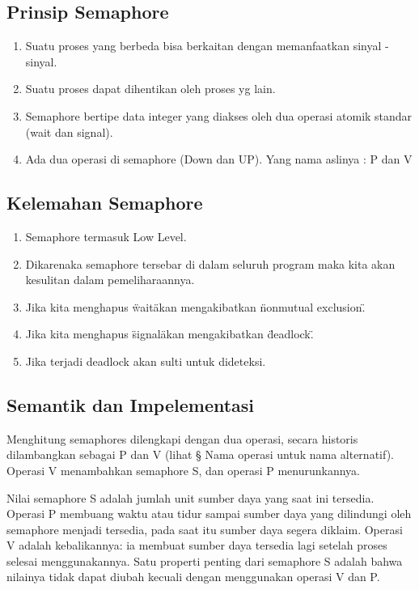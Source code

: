 	\subsection{Prinsip Semaphore}
	
		\begin{enumerate}

			\item Suatu proses yang berbeda bisa berkaitan dengan memanfaatkan sinyal - sinyal.
			\item Suatu proses dapat dihentikan oleh proses yg lain.
			\item Semaphore bertipe data integer yang diakses oleh dua operasi atomik standar (wait dan signal).
			\item Ada dua operasi di semaphore (Down dan UP). Yang nama aslinya : P dan V
		
		\end{enumerate}

	\subsection{Kelemahan Semaphore}
	
		\begin{enumerate}

			\item Semaphore termasuk Low Level.
			\item Dikarenaka semaphore tersebar di dalam seluruh program maka kita akan kesulitan dalam pemeliharaannya.
			\item Jika kita menghapus \"wait\" akan mengakibatkan \"nonmutual exclusion\".
			\item Jika kita menghapus \"signal\" akan mengakibatkan \"deadlock\".
			\item Jika terjadi deadlock akan sulti untuk dideteksi.

		\end{enumerate}
		
	\subsection{Semantik dan Impelementasi}
		Menghitung semaphores dilengkapi dengan dua operasi, secara historis dilambangkan sebagai P dan V (lihat § Nama operasi untuk nama alternatif). Operasi V menambahkan semaphore S, dan operasi P menurunkannya.

		Nilai semaphore S adalah jumlah unit sumber daya yang saat ini tersedia. Operasi P membuang waktu atau tidur sampai sumber daya yang dilindungi oleh semaphore menjadi tersedia, pada saat itu sumber daya segera diklaim. Operasi V adalah kebalikannya: ia membuat sumber daya tersedia lagi setelah proses selesai menggunakannya. Satu properti penting dari semaphore S adalah bahwa nilainya tidak dapat diubah kecuali dengan menggunakan operasi V dan P.

